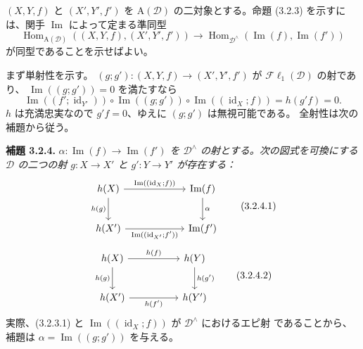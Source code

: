 \clearpage
{}%
\begingroup\small
\setlength{\parskip}{0pt}\setlength{\emergencystretch}{1.5em}

$(X,Y,f)$ と $(X',Y',f')$ を $\mathrm A(\mathcal D)$ の二対象とする。命題
(3.2.3) を示すには、関手 $\operatorname{Im}$ によって定まる準同型
\[
\operatorname{Hom}_{\mathrm A(\mathcal D)}((X,Y,f),(X',Y',f'))
\longrightarrow
\operatorname{Hom}_{\mathcal D^\wedge}(\operatorname{Im}(f),\operatorname{Im}(f'))
\tag{3.2.3.2}
\]
が同型であることを示せばよい。

まず単射性を示す。
$(g;g')\colon(X,Y,f)\to(X',Y',f')$ が
$\mathcal{F}\ell_1(\mathcal D)$ の射であり、
$\operatorname{Im}((g;g'))=0$ を満たすなら
\[
\operatorname{Im}((f';\operatorname{id}_{Y'}))\circ
\operatorname{Im}((g;g'))\circ
\operatorname{Im}((\operatorname{id}_X;f))=h(g'f)=0.
\]
$h$ は充満忠実なので $g'f=0$、ゆえに $(g;g')$ は無視可能である。
全射性は次の補題から従う。

\medskip\noindent\textbf{補題 3.2.4.}\quad
\textit{$\alpha\colon\operatorname{Im}(f)\to\operatorname{Im}(f')$ を
$\mathcal D^\wedge$ の射とする。次の図式を可換にする $\mathcal D$ の二つの射
$g\colon X\to X'$ と $g'\colon Y\to Y'$ が存在する：}
\[
\begin{tikzcd}[column sep=6em,row sep=2.3em]
h(X)\arrow[r,"\operatorname{Im}((\operatorname{id}_X;f))"]\arrow[d,"h(g)"']&
\operatorname{Im}(f)\arrow[d,"\alpha"]\\
h(X')\arrow[r,"\operatorname{Im}((\operatorname{id}_{X'};f'))"']&\operatorname{Im}(f')
\end{tikzcd}\tag{3.2.4.1}
\]
\[
\begin{tikzcd}[column sep=5em,row sep=2.3em]
h(X)\arrow[r,"h(f)"]\arrow[d,"h(g)"']&h(Y)\arrow[d,"h(g')"]\\
h(X')\arrow[r,"h(f')"']&h(Y')
\end{tikzcd}\tag{3.2.4.2}
\]
実際、(3.2.3.1) と $\operatorname{Im}((\operatorname{id}_X;f))$ が
$\mathcal D^\wedge$ におけるエピ射
であることから、補題は $\alpha=\operatorname{Im}((g;g'))$ を与える。
\endgroup
